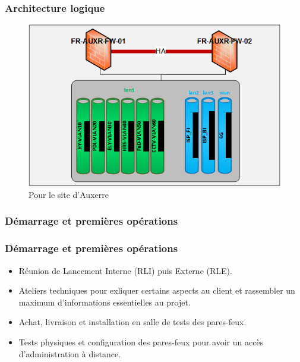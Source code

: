 \documentclass[french, a4paper]{beamer}
\begin{document}
\begin{frame}
    \frametitle{Architecture logique}
    \begin{figure}[h!]
        \centering
        \includegraphics[width = 0.9\linewidth]{img/doc-hy/site-logi-arch.png}
        \caption{Pour le site d'Auxerre}%
        \label{fig:doc-hy/site-logi-arch}
    \end{figure}
\end{frame}

\subsubsection{Démarrage et premières opérations}

\begin{frame}
    \frametitle{Démarrage et premières opérations}
    \begin{itemize}
        \item Réunion de Lancement Interne (RLI) puis Externe (RLE).
        \item Ateliers techniques pour exliquer certains aspects au client et
            rassembler un maximum d'informations essentielles au projet.
        \item Achat, livraison et installation en salle de tests des pares-feux.
        \item Tests physiques et configuration des pares-feux pour avoir un
            accès d'administration à distance.
    \end{itemize}
\end{frame}
\end{document}
